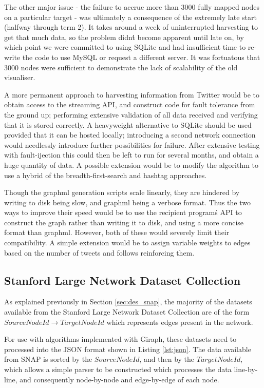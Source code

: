 The other major issue - the failure to accrue more than 3000 fully mapped nodes on a particular target - was ultimately a consequence of the extremely late start (halfway through term 2). It takes around a week of uninterrupted harvesting to get that much data, so the problem didn\'t become apparent until late on, by which point we were committed to using SQLite and had insufficient time to re-write the code to use MySQL or request a different server. It was fortuatous that 3000 nodes were sufficient to demonstrate the lack of scalability of the old visualiser.

A more permanent approach to harvesting information from Twitter would be to obtain access to the streaming API, and construct code for fault tolerance from the ground up; performing extensive validation of all data received and verifying that it is stored correctly. A heavyweight alternative to SQLite should be used provided that it can be hosted locally; introducing a second network connection would needlessly introduce further possibilities for failure. After extensive testing with fault-ijection this could then be left to run for several months, and obtain a huge quantity of data. A possible extension would be to modify the algorithm to use a hybrid of the breadth-first-search and hashtag approaches.

Though the graphml generation scripts scale linearly, they are hindered by writing to disk being slow, and graphml being a verbose format. Thus the two ways to improve their speed would be to use the recipient program\'s API to construct the graph rather than writing it to disk, and using a more concise format than graphml. However, both of these would severely limit their compatibility. A simple extension would be to assign variable weights to edges based on the number of tweets and follows reinforcing them.

\subsection{Stanford Large Network Dataset Collection}
As explained previously in Section \ref{sec:des_snap}, the majority of the datasets available from the Stanford Large Network Dataset Collection are of the form $SourceNodeId \rightarrow TargetNodeId$ which represents edges present in the network.

For use with algorithms implemented with Giraph, these datasets need to processed into the JSON format shown in Listing \ref{lst:json}. The data available from SNAP is sorted by the $SourceNodeId$, and then by the $TargetNodeId$, which allows a simple parser to be constructed which processes the data line-by-line, and consequently node-by-node and edge-by-edge of each node.

